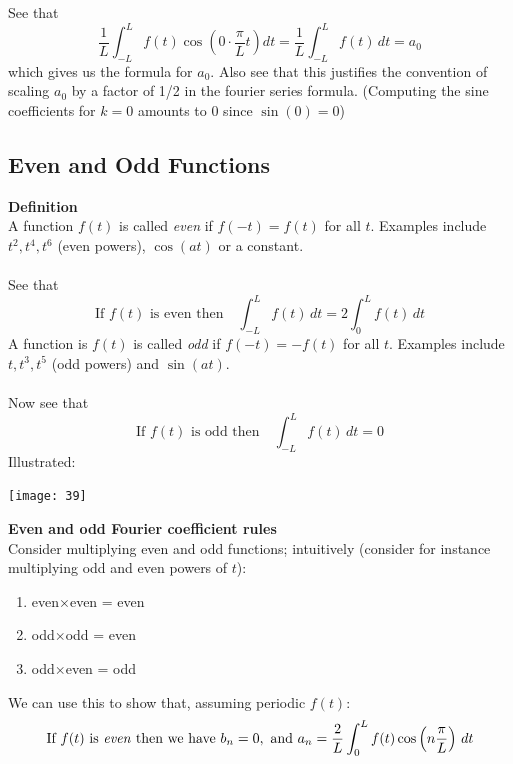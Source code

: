\documentclass{report}
\begin{document}
See that
\begin{equation*}
\frac{1}{L}\int^L_{-L}f(t)\cos\left(0\cdot\frac{\pi}{L}t\right)dt=\frac{1}{L}\int^L_{-L}f(t)\,dt=a_0
\end{equation*}
which gives us the formula for $a_0$. Also see that this justifies the convention of scaling $a_0$ by a 
factor of 1/2 in the fourier series formula. (Computing the sine coefficients for $k=0$ amounts to 0 since $\sin(0)=0$)
\newpage

\subsection{Even and Odd Functions}
\textbf{Definition}\\
A function $f(t)$ is called \textit{even} if $f(-t)=f(t)$ for all $t$. Examples include
$t^2,t^4,t^6$ (even powers), $\cos(at)$ or a constant.\\
\vspace{1mm}\\
See that
\begin{equation*}
\text{If }f(t)\text{ is even then}\quad\int^L_{-L}f(t)\,dt=2\int^L_{0}f(t)\,dt
\end{equation*}
A function is $f(t)$ is called \textit{odd} if $f(-t)=-f(t)$ for all $t$. Examples include
$t,t^3,t^5$ (odd powers) and $\sin(at)$.\\
\vspace{1mm}\\
Now see that
\begin{equation*}
\text{If }f(t)\text{ is odd then}\quad\int^L_{-L}f(t)\,dt=0
\end{equation*}
Illustrated:
\begin{center}
\texttt{[image: 39]}\\
\end{center}
\textbf{Even and odd Fourier coefficient rules}\\
Consider multiplying even and odd functions; intuitively (consider for instance multiplying 
odd and even powers of $t$):
\begin{enumerate}
\item even$\times$even = even
\item odd$\times$odd = even
\item odd$\times$even = odd
\end{enumerate}
We can use this to show that, assuming periodic $f(t)$:
\begin{equation*}
\text{If }f(t)\text{ is \textit{even} then we have }b_n=0,\text{ and }a_n=\frac{2}{L}\int^L_0f(t)\cos\left(n\frac{\pi}{L}\right)\,dt
\end{equation*}
\end{document}
